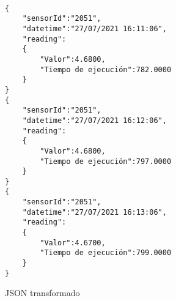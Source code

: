 \begin{listing}
\begin{verbatim}

{
    "sensorId":"2051",
    "datetime":"27/07/2021 16:11:06",
    "reading": 
    {
        "Valor":4.6800,
        "Tiempo de ejecución":782.0000
    }
}
{
    "sensorId":"2051",
    "datetime":"27/07/2021 16:12:06",
    "reading": 
    {
        "Valor":4.6800,
        "Tiempo de ejecución":797.0000
    }
}
{
    "sensorId":"2051",
    "datetime":"27/07/2021 16:13:06",
    "reading": 
    {
        "Valor":4.6700,
        "Tiempo de ejecución":799.0000
    }
}

\end{verbatim}
\caption{JSON transformado} 
\label{json-transformado-example}
\end{listing}

\newpage
\begin{comment}
\section{Diseño del proyecto}

El núcleo del programa es el script \textit{Monitorizacion_IOT} el cual es un servicio que se repite cada X segundos.

\noindent\fbox{
\begin{minipage}{1\textwidth}
\begin{algorithmic}[1]

\While{True}
    
    \For{id in listaSensores}
        \State $fechaInicio \gets Fecha del sistema - 30 minutos$
        \State $fechaFin \gets Fecha del sistema $
        
        \If{fichero ""tempData"" + id + "".json"" exist}
            \State descarga\_datos\_PRTG
            \State transformar\_datos
            \State comparar\_ficheros
            \State subir\_datos
            
            \State Copiar
            \State Borrar
        \Else
            \State descarga\_datos\_PRTG
            \State transformar\_datos
            \State subir\_datos
            
            \State Copiar
            \State Borrar
        \EndIf
        
        \State Entrenar Modelo
        \State Subir Datos entrenamiento
        
        \State Borrar\_datos\_predicciones
        \State Predecir
        \State Subir datos predicción
        
    \EndFor
\EndWhile

\end{algorithmic}
\end{minipage}
}
\end{comment}
